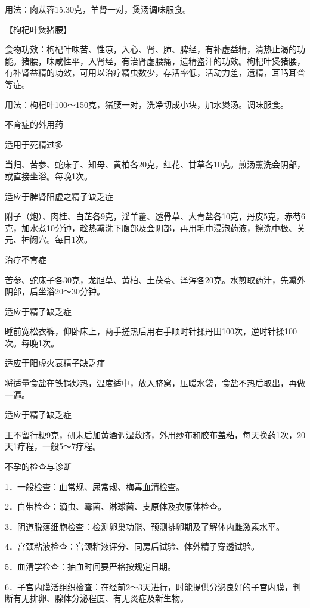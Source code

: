 \documentclass[12pt,UTF8,openany]{ctexbook}
\begin{document}
用法：肉苁蓉15.30克，羊肾一对，煲汤调味服食。

【枸杞叶煲猪腰】

食物功效：枸杞叶味苦、性凉，入心、肾、肺、脾经，有补虚益精，清热止渴的功能。猪腰，味咸性平，入肾经，有治肾虚腰痛，遗精盗汗的功效。枸杞叶煲猪腰，有补肾益精的功效，可用以治疗精虫数少，存活率低，活动力差，遗精，耳鸣耳聋等症。

用法：枸杞叶100～150克，猪腰一对，洗净切成小块，加水煲汤。调味服食。





不育症的外用药


适用于死精过多

当归、苦参、蛇床子、知母、黄柏各20克，红花、甘草各10克。煎汤薰洗会阴部，或直接坐浴。每晚1次。

适应于脾肾阳虚之精子缺乏症

附子（炮）、肉桂、白芷各9克，淫羊藿、透骨草、大青盐各10克，丹皮5克，赤芍6克，加水煮10分钟，趁热熏洗下腹部及会阴部，再用毛巾浸泡药液，擦洗中极、关元、神阙穴。每日1次。

治疗不育症

苦参、蛇床子各30克，龙胆草、黄柏、土茯苓、泽泻各20克。水煎取药汁，先熏外阴部，后坐浴20～30分钟。

适应于精子缺乏症

睡前宽松衣裤，仰卧床上，两手搓热后用右手顺时针揉丹田100次，逆时针揉100次。每晚1次。

适应于阳虚火衰精子缺乏症

将适量食盐在铁锅炒热，温度适中，放入脐窝，压暖水袋，食盐不热后取出，再做一遍。

适应于精子缺乏症

王不留行粳9克，研末后加黄酒调湿敷脐，外用纱布和胶布盖粘，每天换药1次，20天1疗程，一般5～7疗程。





不孕的检查与诊断


1．一般检查：血常规、尿常规、梅毒血清检查。

2．白带检查：滴虫、霉菌、淋球菌、支原体及衣原体检查。

3．阴道脱落细胞检查：检测卵巢功能、预测排卵期及了解体内雌激素水平。

4．宫颈粘液检查：宫颈粘液评分、同房后试验、体外精子穿透试验。

5．血清学检查：抽血时间要严格按规定日期。

6．子宫内膜活组织检查：在经前2～3天进行，时能提供分泌良好的子宫内膜，判断有无排卵、腺体分泌程度、有无炎症及新生物。
\end{document}
